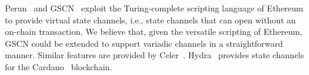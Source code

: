 %

  Perun~\cite{perun} and GSCN~\cite{DBLP:conf/ccs/DziembowskiFH18} exploit the
  Turing-complete scripting language of Ethereum to provide virtual state
  channels, i.e., state channels that can open without an on-chain transaction.
  We believe that, given the versatile scripting of Ethereum, GSCN could be
  extended to support variadic channels in a straightforward manner. Similar
  features are provided by Celer~\cite{dong2018celer}.
  Hydra~\cite{cryptoeprint:2020:299} provides state channels for the
  Cardano~\cite{cardano} blockchain.



